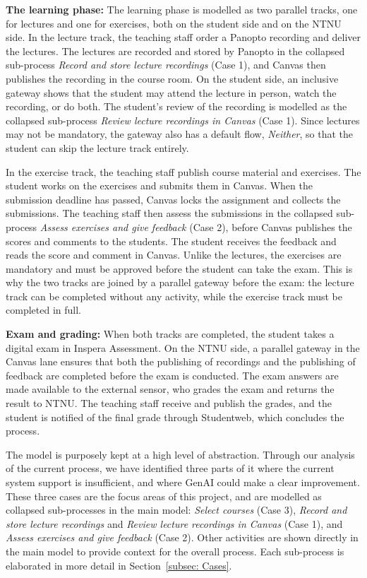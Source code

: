 \textbf{The learning phase:} The learning phase is modelled as two parallel tracks, one for lectures and one for exercises, both on the student side and on the NTNU side. In the lecture track, the teaching staff order a Panopto recording and deliver the lectures. The lectures are recorded and stored by Panopto in the collapsed sub-process \textit{Record and store lecture recordings} (Case 1), and Canvas then publishes the recording in the course room. On the student side, an inclusive gateway shows that the student may attend the lecture in person, watch the recording, or do both. The student's review of the recording is modelled as the collapsed sub-process \textit{Review lecture recordings in Canvas} (Case 1). Since lectures may not be mandatory, the gateway also has a default flow, \textit{Neither}, so that the student can skip the lecture track entirely.

In the exercise track, the teaching staff publish course material and exercises. The student works on the exercises and submits them in Canvas. When the submission deadline has passed, Canvas locks the assignment and collects the submissions. The teaching staff then assess the submissions in the collapsed sub-process \textit{Assess exercises and give feedback} (Case 2), before Canvas publishes the scores and comments to the students. The student receives the feedback and reads the score and comment in Canvas. Unlike the lectures, the exercises are mandatory and must be approved before the student can take the exam. This is why the two tracks are joined by a parallel gateway before the exam: the lecture track can be completed without any activity, while the exercise track must be completed in full. 

\textbf{Exam and grading:} When both tracks are completed, the student takes a digital exam in Inspera Assessment. On the NTNU side, a parallel gateway in the Canvas lane ensures that both the publishing of recordings and the publishing of feedback are completed before the exam is conducted. The exam answers are made available to the external sensor, who grades the exam and returns the result to NTNU. The teaching staff receive and publish the grades, and the student is notified of the final grade through Studentweb, which concludes the process.

The model is purposely kept at a high level of abstraction. Through our analysis of the current process, we have identified three parts of it where the current system support is insufficient, and where GenAI could make a clear improvement. These three cases are the focus areas of this project, and are modelled as collapsed sub-processes in the main model: \textit{Select courses} (Case 3), \textit{Record and store lecture recordings} and \textit{Review lecture recordings in Canvas} (Case 1), and \textit{Assess exercises and give feedback} (Case 2). Other activities are shown directly in the main model to provide context for the overall process. Each sub-process is elaborated in more detail in Section~\ref{subsec: Cases}.

